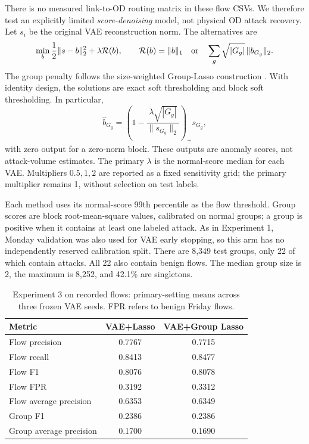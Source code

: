 \documentclass[12pt]{article}
\begin{document}
There is no measured link-to-OD routing matrix in these flow CSVs. We therefore
test an explicitly limited \emph{score-denoising} model, not physical OD attack
recovery. Let $s_i$ be the original VAE reconstruction norm. The alternatives are
\[
 \min_b\frac12\|s-b\|_2^2+\lambda\mathcal R(b),\qquad
 \mathcal R(b)=\|b\|_1\quad\hbox{or}\quad
 \sum_g\sqrt{|G_g|}\,\|b_{G_g}\|_2.
\]
The group penalty follows the size-weighted Group-Lasso construction
\cite{YuanLin2006}. With identity design, the solutions are exact soft
thresholding and block soft thresholding. In particular,
\[
 \hat b_{G_g}=\left(1-\frac{\lambda\sqrt{|G_g|}}
 {\|s_{G_g}\|_2}\right)_+s_{G_g},
\]
with zero output for a zero-norm block. These outputs are anomaly scores,
not attack-volume estimates. The primary $\lambda$ is the normal-score median
for each VAE. Multipliers $0.5,1,2$ are reported as a fixed sensitivity grid;
the primary multiplier remains 1, without selection on test labels.

Each method uses its normal-score 99th percentile as the flow threshold.
Group scores are block root-mean-square values, calibrated on normal groups;
a group is positive when it contains at least one labeled attack. As in
Experiment 1, Monday validation was also used for VAE early stopping, so this
arm has no independently reserved calibration split. There are 8,349 test
groups, only 22 of which contain attacks. All 22 also contain benign flows.
The median group size is 2, the maximum is 8,252, and 42.1\% are singletons.

\begin{table}[H]
\centering
\caption{Experiment 3 on recorded flows: primary-setting means across three
frozen VAE seeds. FPR refers to benign Friday flows.}
\begin{tabular}{lcc}
\toprule
Metric & VAE+Lasso & VAE+Group Lasso \\
\midrule
Flow precision & 0.7767 & 0.7715 \\
Flow recall & 0.8413 & 0.8477 \\
Flow F1 & 0.8076 & 0.8078 \\
Flow FPR & 0.3192 & 0.3312 \\
Flow average precision & 0.6353 & 0.6349 \\
Group F1 & 0.2386 & 0.2386 \\
Group average precision & 0.1700 & 0.1690 \\
\bottomrule
\end{tabular}
\label{tab:exp3_real}
\end{table}
\end{document}
